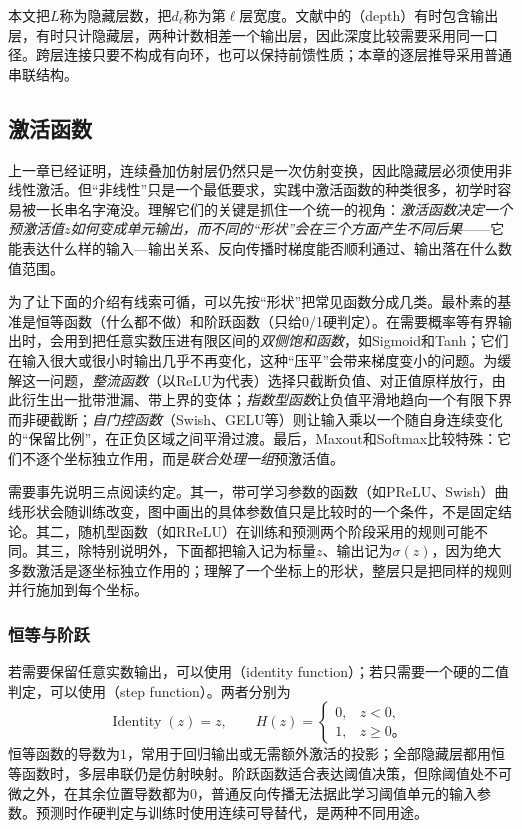 本文把$L$称为隐藏层数，把$d_\ell$称为第$\ell$层宽度。文献中的（depth）有时包含输出层，有时只计隐藏层，两种计数相差一个输出层，因此深度比较需要采用同一口径。跨层连接只要不构成有向环，也可以保持前馈性质；本章的逐层推导采用普通串联结构。

\subsection{激活函数}
\label{sec:ffn-activations}

上一章已经证明，连续叠加仿射层仍然只是一次仿射变换，因此隐藏层必须使用非线性激活。但“非线性”只是一个最低要求，实践中激活函数的种类很多，初学时容易被一长串名字淹没。理解它们的关键是抓住一个统一的视角：\emph{激活函数决定一个预激活值$z$如何变成单元输出，而不同的“形状”会在三个方面产生不同后果}——它能表达什么样的输入—输出关系、反向传播时梯度能否顺利通过、输出落在什么数值范围。

为了让下面的介绍有线索可循，可以先按“形状”把常见函数分成几类。最朴素的基准是恒等函数（什么都不做）和阶跃函数（只给0/1硬判定）。在需要概率等有界输出时，会用到把任意实数压进有限区间的\emph{双侧饱和函数}，如Sigmoid和Tanh；它们在输入很大或很小时输出几乎不再变化，这种“压平”会带来梯度变小的问题。为缓解这一问题，\emph{整流函数}（以ReLU为代表）选择只截断负值、对正值原样放行，由此衍生出一批带泄漏、带上界的变体；\emph{指数型函数}让负值平滑地趋向一个有限下界而非硬截断；\emph{自门控函数}（Swish、GELU等）则让输入乘以一个随自身连续变化的“保留比例”，在正负区域之间平滑过渡。最后，Maxout和Softmax比较特殊：它们不逐个坐标独立作用，而是\emph{联合处理一组}预激活值。

需要事先说明三点阅读约定。其一，带可学习参数的函数（如PReLU、Swish）曲线形状会随训练改变，图中画出的具体参数值只是比较时的一个条件，不是固定结论。其二，随机型函数（如RReLU）在训练和预测两个阶段采用的规则可能不同。其三，除特别说明外，下面都把输入记为标量$z$、输出记为$\sigma(z)$，因为绝大多数激活是逐坐标独立作用的；理解了一个坐标上的形状，整层只是把同样的规则并行施加到每个坐标。

\subsubsection{恒等与阶跃}
\label{sec:ffn-activation-baselines}

若需要保留任意实数输出，可以使用（identity function）；若只需要一个硬的二值判定，可以使用（step function）。两者分别为
\begin{equation}
  \operatorname{Identity}(z)=z,
  \qquad
  H(z)=\begin{cases}0,&z<0,\\1,&z\geq0\text{。}\end{cases}
  \label{eq:ffn-identity-step}
\end{equation}
恒等函数的导数为$1$，常用于回归输出或无需额外激活的投影；全部隐藏层都用恒等函数时，多层串联仍是仿射映射。阶跃函数适合表达阈值决策，但除阈值处不可微之外，在其余位置导数都为$0$，普通反向传播无法据此学习阈值单元的输入参数。预测时作硬判定与训练时使用连续可导替代，是两种不同用途。

